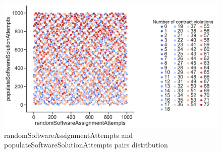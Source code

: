 \begin{figure}
	\centering
	\includegraphics[width=\textwidth]{images/PairsDistr/randomSoftwareAssignmentAttempts_populateSoftwareSolutionAttempts.pdf}
	\caption[randomSoftwareAssignmentAttempts and populateSoftwareSolutionAttempts pairs distribution]{randomSoftwareAssignmentAttempts and populateSoftwareSolutionAttempts pairs distribution} 
	\label{fig:randomSoftwareAssignmentAttempts_populateSoftwareSolutionAttempts_pair}
\end{figure}
\clearpage